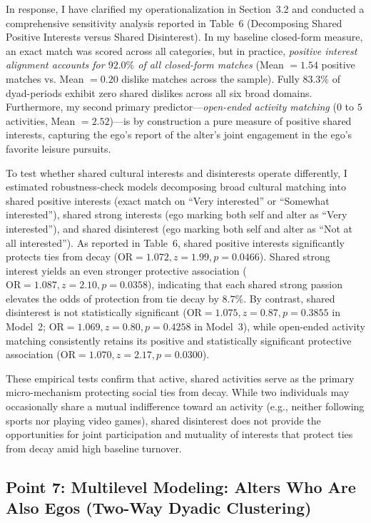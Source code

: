 \documentclass[11pt]{article}
\begin{document}
In response, I have clarified my operationalization in Section~3.2 and conducted a comprehensive sensitivity analysis reported in Table~6 (Decomposing Shared Positive Interests versus Shared Disinterest). In my baseline closed-form measure, an exact match was scored across all categories, but in practice, \textit{positive interest alignment accounts for $92.0\%$ of all closed-form matches} (Mean $= 1.54$ positive matches vs. Mean $= 0.20$ dislike matches across the sample). Fully $83.3\%$ of dyad-periods exhibit zero shared dislikes across all six broad domains. Furthermore, my second primary predictor—\textit{open-ended activity matching} ($0$ to $5$ activities, Mean $= 2.52$)—is by construction a pure measure of positive shared interests, capturing the ego's report of the alter's joint engagement in the ego's favorite leisure pursuits.

To test whether shared cultural interests and disinterests operate differently, I estimated robustness-check models decomposing broad cultural matching into shared positive interests (exact match on ``Very interested'' or ``Somewhat interested''), shared strong interests (ego marking both self and alter as ``Very interested''), and shared disinterest (ego marking both self and alter as ``Not at all interested''). As reported in Table~6, shared positive interests significantly protects ties from decay ($\text{OR} = 1.072, z = 1.99, p = 0.0466$). Shared strong interest yields an even stronger protective association ($\text{OR} = 1.087, z = 2.10, p = 0.0358$), indicating that each shared strong passion elevates the odds of protection from tie decay by $8.7\%$. By contrast, shared disinterest is not statistically significant ($\text{OR} = 1.075, z = 0.87, p = 0.3855$ in Model~2; $\text{OR} = 1.069, z = 0.80, p = 0.4258$ in Model~3), while open-ended activity matching consistently retains its positive and statistically significant protective association ($\text{OR} = 1.070, z = 2.17, p = 0.0300$).

These empirical tests confirm that active, shared activities serve as the primary micro-mechanism protecting social ties from decay. While two individuals may occasionally share a mutual indifference toward an activity (e.g., neither following sports nor playing video games), shared disinterest does not provide the opportunities for joint participation and mutuality of interests that protect ties from decay amid high baseline turnover.

\subsection*{Point 7: Multilevel Modeling: Alters Who Are Also Egos (Two-Way Dyadic Clustering)}
\end{document}
